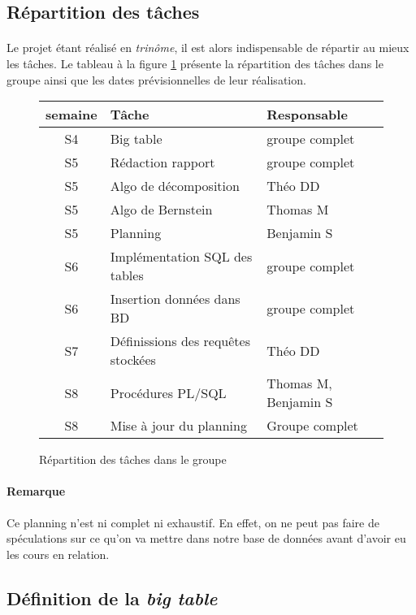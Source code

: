 \subsection{Répartition des tâches}

\paragraph{}{
    Le projet étant réalisé en \textit{trinôme}, il est alors indispensable de répartir au mieux les tâches.
    Le tableau à la figure \ref{fig:planning} présente la répartition des tâches dans le groupe ainsi que les dates prévisionnelles
    de leur réalisation.
}

\begin{figure}
\centering
    \begin{tabular}{|c|p{16em}|p{12em}|}
    	\hline \textbf{semaine} & \textbf{Tâche} & \textbf{Responsable} \\ 
    	\hline S4 & Big table & groupe complet \\ 
    	\hline S5 & Rédaction rapport & groupe complet \\ 
    	\hline S5 & Algo de décomposition & Théo DD \\ 
    	\hline S5 & Algo de Bernstein & Thomas M \\ 
    	\hline S5 & Planning & Benjamin S \\ 
    	\hline S6 & Implémentation SQL des tables & groupe complet \\
    	\hline S6 & Insertion données dans BD & groupe complet \\ 
    	\hline S7 & Définissions des requêtes stockées & Théo DD \\ 
    	\hline S8 & Procédures PL/SQL & Thomas M, Benjamin S \\ 
    	\hline S8 & Mise à jour du planning & Groupe complet \\ 
    	\hline 
    \end{tabular} 
\caption{Répartition des tâches dans le groupe}
\label{fig:planning}
\end{figure}

\paragraph{Remarque}{
    Ce planning n'est ni complet ni exhaustif. En effet, on ne peut pas faire de spéculations sur ce qu'on va mettre dans notre base de données avant d'avoir eu les cours en relation.
}

\subsection{Définition de la \textit{big table}}

